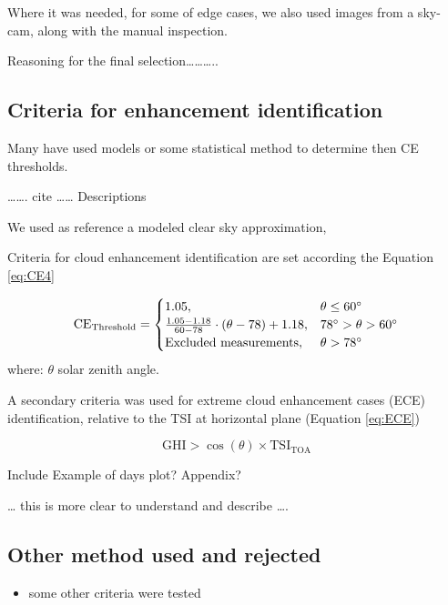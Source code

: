 \documentclass[
]{article}
\providecommand{\tightlist}{%
  \setlength{\itemsep}{0pt}\setlength{\parskip}{0pt}}
\begin{document}
Where it was needed, for some of edge cases, we also used images from a sky-cam,
along with the manual inspection.

Reasoning for the final selection\ldots\ldots\ldots..

\hypertarget{criteria-for-enhancement-identification}{%
\subsection{Criteria for enhancement identification}\label{criteria-for-enhancement-identification}}

Many have used models or some statistical method to determine then CE thresholds.

\ldots\ldots. cite \ldots\ldots{} Descriptions

We used as reference a modeled clear sky approximation,

Criteria for cloud enhancement identification are set according the Equation \ref{eq:CE4}

\begin{equation}
\text{CE}_\text{Threshold} = \begin{cases}
1.05, & \text{$\theta \leq 60^\circ$}\\
\frac{1.05 - 1.18}{60 - 78} \cdot (\theta- 78) + 1.18 , & \text{$ 78^\circ > \theta > 60^\circ$}\\
\text{Excluded measurements}, & \theta > 78^\circ
\end{cases}\label{eq:CE4}
\end{equation}
where: \(\theta\) solar zenith angle.

A secondary criteria was used for extreme cloud enhancement cases (ECE) identification, relative to the TSI at horizontal plane (Equation \ref{eq:ECE})

\begin{equation}
\text{GHI} > \cos(\theta) \times \text{TSI}_\text{TOA}
\label{eq:ECE}
\end{equation}

Include Example of days plot? Appendix?

\ldots{} this is more clear to understand and describe \ldots.

\hypertarget{other-method-used-and-rejected}{%
\subsection{Other method used and rejected}\label{other-method-used-and-rejected}}

\begin{itemize}
\tightlist
\item
  some other criteria were tested
\end{itemize}
\end{document}
